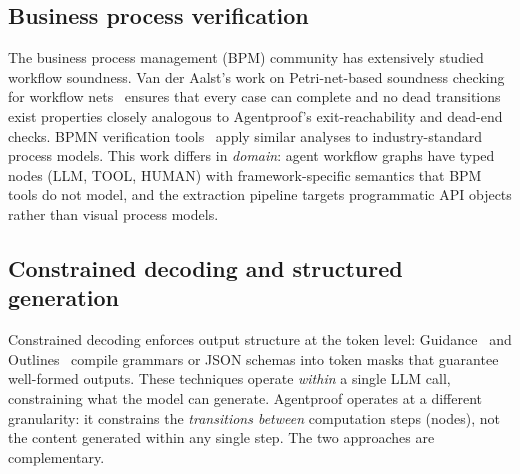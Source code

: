 \subsection{Business process verification}

The business process management (BPM) community has extensively studied
workflow soundness. Van der Aalst's work on Petri-net-based soundness
checking for workflow nets~\citep{vanderaalst2011bpm} ensures that
every case can complete and no dead transitions exist properties
closely analogous to Agentproof's exit-reachability and dead-end checks. BPMN
verification tools~\citep{dijkman2008bpmn} apply similar analyses to
industry-standard process models.
This work differs in \emph{domain}: agent workflow graphs have typed
nodes (LLM, TOOL, HUMAN) with framework-specific semantics that BPM
tools do not model, and the extraction pipeline targets programmatic API
objects rather than visual process models.

\subsection{Constrained decoding and structured generation}

Constrained decoding enforces output structure at the token level:
Guidance~\citep{guidance2023} and Outlines~\citep{outlines2023} compile
grammars or JSON schemas into token masks that guarantee well-formed
outputs. These techniques operate \emph{within} a single LLM call,
constraining what the model can generate. Agentproof operates at a
different granularity: it constrains the \emph{transitions between}
computation steps (nodes), not the content generated within any single
step. The two approaches are complementary.
